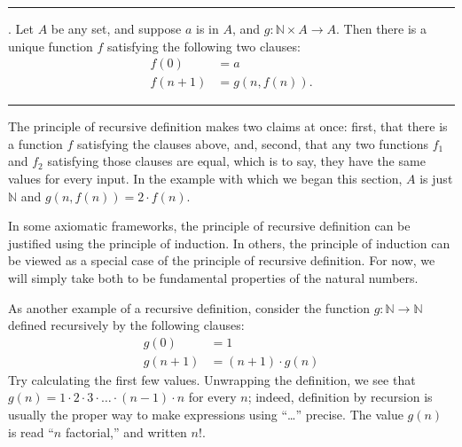 \documentclass[letterpaper,10pt,english]{sphinxmanual}
\begin{document}
\bigskip\hrule\bigskip


\sphinxAtStartPar
{}. Let \(A\) be any set, and suppose \(a\) is in \(A\), and \(g : \mathbb{N} \times A \to A\). Then there is a unique function \(f\) satisfying the following two clauses:
\begin{equation*}
\begin{split}f(0) & = a \\
f(n + 1) & = g(n, f(n)).\end{split}
\end{equation*}

\bigskip\hrule\bigskip


\sphinxAtStartPar
The principle of recursive definition makes two claims at once: first, that there is a function \(f\) satisfying the clauses above, and, second, that any two functions \(f_1\) and \(f_2\) satisfying those clauses are equal, which is to say, they have the same values for every input. In the example with which we began this section, \(A\) is just \(\mathbb{N}\) and \(g(n, f(n)) = 2 \cdot f(n)\).

\sphinxAtStartPar
In some axiomatic frameworks, the principle of recursive definition can be justified using the principle of induction. In others, the principle of induction can be viewed as a special case of the principle of recursive definition. For now, we will simply take both to be fundamental properties of the natural numbers.

\sphinxAtStartPar
As another example of a recursive definition, consider the function \(g : \mathbb{N} \to \mathbb{N}\) defined recursively by the following clauses:
\begin{equation*}
\begin{split}g(0) & = 1 \\
g(n+1) & = (n + 1) \cdot g(n)\end{split}
\end{equation*}
\sphinxAtStartPar
Try calculating the first few values. Unwrapping the definition, we see that \(g(n) = 1 \cdot 2 \cdot 3 \cdot \ldots \cdot (n-1) \cdot n\) for every \(n\); indeed, definition by recursion is usually the proper way to make expressions using “…” precise. The value \(g(n)\) is read “\(n\) factorial,” and written \(n!\).
\end{document}
